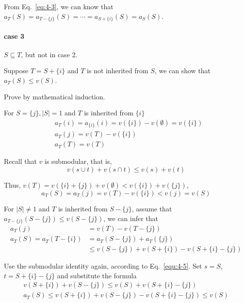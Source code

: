 \documentclass[oneside,solution]{seu-ml-assign}
\begin{document}
From Eq.~\eqref{eq:4-3}, we can know
that \(a_{T}(S)=a_{T-\{j\}}(S)=\cdots=a_{S+\{i\}}(S)=a_{S}(S)\).

\paragraph{case 3} \(S \subseteq T\), but not in case 2.

Suppose \(T=S+\{i\}\) and \(T\) is not inherited from \(S\), we can show
that \(a_T(S)\leq v(S)\).

Prove by mathematical induction.

For \(S=\{j\},|S|=1\) and \(T\) is inherited from \(\{i\}\)
\begin{equation}
    \begin{aligned}
    &a_T(i)=a_{\{i\}}(i)=v(\{i\})-v(\emptyset)=v(\{i\})\\
&a_T(j)=v(T)-v(\{i\})\\
&a_T(T)=v(T)
    \end{aligned}
\end{equation}

Recall that \(v\) is submodular, that is,
\begin{equation}
    v(s\cup t)+v(s\cap t)\leq v(s)+v(t)
    \label{equ:4-5}
\end{equation}

Thus, \(v(T)=v(\{i\}+\{j\})+v(\emptyset)<v(\{i\})+v(\{j\})\),
\begin{equation}
    a_T(S)=a_T(j)=v(T)-v(\{i\})<v({j})=v(S)
\end{equation}

For \(|S|\neq1\) and \(T\) is inherited from \(S-\{j\}\), assume that
\(a_{T-\{j\}}(S-\{j\})\leq v(S-\{j\})\), we can infer that
\begin{equation}
    \begin{aligned}
    a_{T}(j)&=v(T)-v(T-\{j\})\\
a_T(S)=a_T(T-\{i\})&=a_T(S-\{j\})+a_T(\{j\})\\
&\leq v(S-\{j\})+v(S+\{i\})-v(S+\{i\}-\{j\})
    \end{aligned}
\end{equation}

Use the submodular identity again, according to Eq.~\eqref{equ:4-5}. Set \(s=S\),
\(t=S+\{i\}-\{j\}\) and substitute the formula
\begin{equation}
    \begin{aligned}
    v(S+\{i\})+v(S-\{j\})\leq v(S)+v(S+\{i\}-\{j\})\\
a_T(S) \leq v(S+\{i\})+v(S-\{j\})-v(S+\{i\}-\{j\}) \leq
v(S)
    \end{aligned}
\end{equation}
\end{document}
